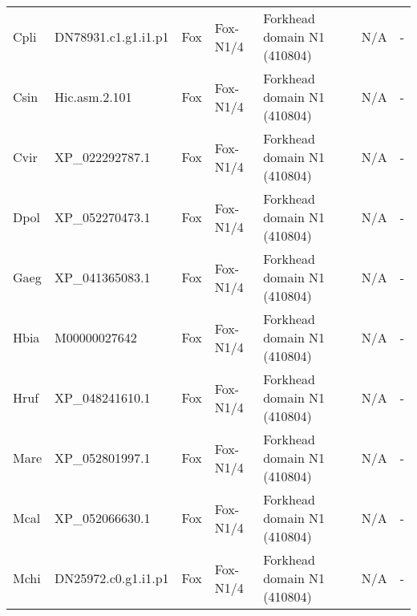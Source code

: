 \documentclass[../main.tex]{subfiles}
\begin{document}
\begin{landscape}
\begin{longtable}{lllllll}
		Cpli           & DN78931.c1.g1.i1.p1   & Fox            & Fox-N1/4            & Forkhead domain N1 (410804)                 & N/A                                                                    & -                    \\
		Csin           & Hic.asm.2.101         & Fox            & Fox-N1/4            & Forkhead domain N1 (410804)                 & N/A                                                                    & -                    \\
		Cvir           & XP\_022292787.1       & Fox            & Fox-N1/4            & Forkhead domain N1 (410804)                 & N/A                                                                    & -                    \\
		Dpol           & XP\_052270473.1       & Fox            & Fox-N1/4            & Forkhead domain N1 (410804)                 & N/A                                                                    & -                    \\
		Gaeg           & XP\_041365083.1       & Fox            & Fox-N1/4            & Forkhead domain N1 (410804)                 & N/A                                                                    & -                    \\
		Hbia           & M00000027642          & Fox            & Fox-N1/4            & Forkhead domain N1 (410804)                 & N/A                                                                    & -                    \\
		Hruf           & XP\_048241610.1       & Fox            & Fox-N1/4            & Forkhead domain N1 (410804)                 & N/A                                                                    & -                    \\
		Mare           & XP\_052801997.1       & Fox            & Fox-N1/4            & Forkhead domain N1 (410804)                 & N/A                                                                    & -                    \\
		Mcal           & XP\_052066630.1       & Fox            & Fox-N1/4            & Forkhead domain N1 (410804)                 & N/A                                                                    & -                    \\
		Mchi           & DN25972.c0.g1.i1.p1   & Fox            & Fox-N1/4            & Forkhead domain N1 (410804)                 & N/A                                                                    & -                    \\

\end{longtable}
\end{landscape}
\end{document}
